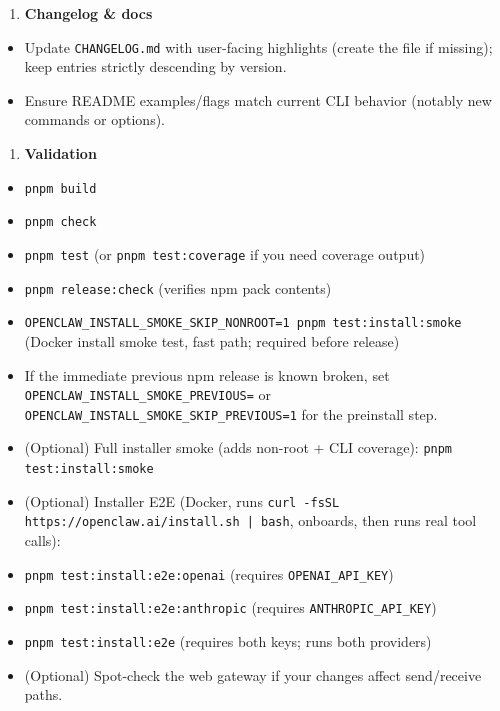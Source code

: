 \begin{enumerate}
  \item \textbf{Changelog \& docs}
\end{enumerate}


\begin{itemize}
  \item [ ] Update \texttt{CHANGELOG.md} with user-facing highlights (create the file if missing); keep entries strictly descending by version.
  \item [ ] Ensure README examples/flags match current CLI behavior (notably new commands or options).
\end{itemize}


\begin{enumerate}
  \item \textbf{Validation}
\end{enumerate}


\begin{itemize}
  \item [ ] \texttt{pnpm build}
  \item [ ] \texttt{pnpm check}
  \item [ ] \texttt{pnpm test} (or \texttt{pnpm test:coverage} if you need coverage output)
  \item [ ] \texttt{pnpm release:check} (verifies npm pack contents)
  \item [ ] \texttt{OPENCLAW\_INSTALL\_SMOKE\_SKIP\_NONROOT=1 pnpm test:install:smoke} (Docker install smoke test, fast path; required before release)
  \item If the immediate previous npm release is known broken, set \texttt{OPENCLAW\_INSTALL\_SMOKE\_PREVIOUS=} or \texttt{OPENCLAW\_INSTALL\_SMOKE\_SKIP\_PREVIOUS=1} for the preinstall step.
  \item [ ] (Optional) Full installer smoke (adds non-root + CLI coverage): \texttt{pnpm test:install:smoke}
  \item [ ] (Optional) Installer E2E (Docker, runs \texttt{curl -fsSL https://openclaw.ai/install.sh | bash}, onboards, then runs real tool calls):
  \item \texttt{pnpm test:install:e2e:openai} (requires \texttt{OPENAI\_API\_KEY})
  \item \texttt{pnpm test:install:e2e:anthropic} (requires \texttt{ANTHROPIC\_API\_KEY})
  \item \texttt{pnpm test:install:e2e} (requires both keys; runs both providers)
  \item [ ] (Optional) Spot-check the web gateway if your changes affect send/receive paths.
\end{itemize}


